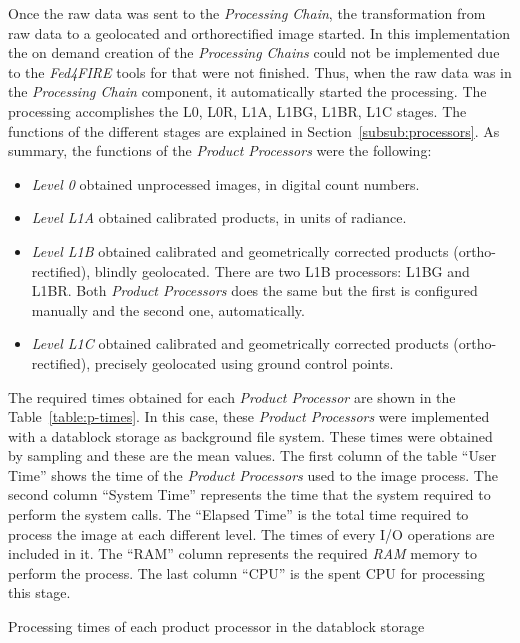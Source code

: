 Once the raw data was sent to the \emph{Processing Chain}, the transformation from
raw data to a geolocated and orthorectified image started. In this implementation the
on demand creation of the \emph{Processing Chains} could not be implemented due to
the \emph{Fed4FIRE} tools for that were not finished.
Thus, when the raw data was in  the \emph{Processing Chain} component, it automatically started the processing. The processing accomplishes the L0, L0R,
L1A, L1BG, L1BR, L1C stages. 
The functions of the different stages are explained
in Section~\ref{subsub:processors}. As summary, the functions of the
\emph{Product Processors} were the following:
\begin{itemize}
\item \emph{Level 0} obtained unprocessed images, in digital count numbers.
\item \emph{Level L1A} obtained calibrated products, in units of radiance.
\item \emph{Level L1B} obtained calibrated and geometrically corrected products
  (ortho-rectified), blindly geolocated. There are two L1B processors: L1BG and
  L1BR. Both \emph{Product Processors} does the same but the first is configured
  manually and the second one, automatically.
\item \emph{Level L1C} obtained calibrated and geometrically corrected products (ortho-rectified), precisely geolocated using ground control points.
\end{itemize}


The required times obtained for
each \emph{Product Processor} are shown in the Table~\ref{table:p-times}. In
this case, these \emph{Product Processors} were implemented with a datablock
storage as background file system. These
times were obtained by sampling and these are the mean values. The first column of the table ``User Time'' shows the  time of the
\emph{Product Processors} used to the image process. The second column ``System
Time'' represents the time that the system required to perform the system calls. The ``Elapsed Time'' is
the total time required to process the image at each different level. The times of every I/O operations are
included in it. The ``RAM'' column represents the required \emph{RAM} memory to
perform the process. The last column ``CPU'' is the spent \ac{CPU} for
processing this stage.

\begin{table}[!h]
  \centering
  {\small
  
  }
  \caption{Processing times of each product processor in the datablock storage}
  \label{table:p-times}
\end{table}

